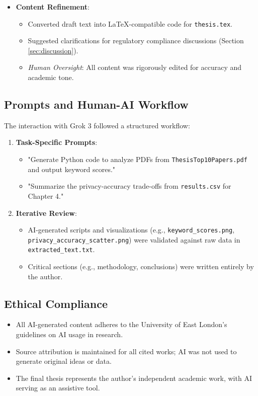 \documentclass[12pt]{report}
\begin{document}
\begin{itemize}
    \item \textbf{Content Refinement}:
    \begin{itemize}
        \item Converted draft text into LaTeX-compatible code for \texttt{thesis.tex}.
        \item Suggested clarifications for regulatory compliance discussions (Section \ref{sec:discussion}).
        \item \textit{Human Oversight}: All content was rigorously edited for accuracy and academic tone.
    \end{itemize}
\end{itemize}

\subsection*{Prompts and Human-AI Workflow}
The interaction with Grok 3 followed a structured workflow:
\begin{enumerate}
    \item \textbf{Task-Specific Prompts}: 
    \begin{itemize}
        \item "Generate Python code to analyze PDFs from \texttt{ThesisTop10Papers.pdf} and output keyword scores."
        \item "Summarize the privacy-accuracy trade-offs from \texttt{results.csv} for Chapter 4."
    \end{itemize}
    \item \textbf{Iterative Review}: 
    \begin{itemize}
        \item AI-generated scripts and visualizations (e.g., \texttt{keyword\_scores.png}, \texttt{privacy\_accuracy\_scatter.png}) were validated against raw data in \texttt{extracted\_text.txt}.
        \item Critical sections (e.g., methodology, conclusions) were written entirely by the author.
    \end{itemize}
\end{enumerate}

\subsection*{Ethical Compliance}
\begin{itemize}
    \item All AI-generated content adheres to the University of East London's guidelines on AI usage in research.
    \item Source attribution is maintained for all cited works; AI was not used to generate original ideas or data.
    \item The final thesis represents the author's independent academic work, with AI serving as an assistive tool.
\end{itemize}
\end{document}
